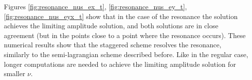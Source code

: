 Figures \ref{fig:resonance_nus_ex_t}, \ref{fig:resonance_nus_ey_t}, \ref{fig:resonance_nus_eyx_t} show that in the case of the resonance
the solution achieves the limiting amplitude solution, and both solutions are in close agreement (but in the points close to a point where the resonance occurs).
These numerical results show that the staggered scheme resolves the resonance, similarly to the semi-lagrangian scheme described before.  
Like in the regular case, 
longer computations are needed to achieve the limiting amplitude solution  
for smaller $\nu$.

